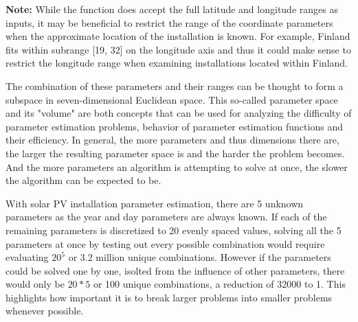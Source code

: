 \noindent \textbf{Note:} While the function does accept the full latitude and longitude ranges as inputs, it may be beneficial to restrict the range of the coordinate parameters when the approximate location of the installation is known. For example, Finland fits within subrange [19, 32] on the longitude axis and thus it could make sense to restrict the longitude range when examining installations located within Finland.

\vspace{3mm}
\noindent The combination of these parameters and their ranges can be thought to form a subspace in seven-dimensional Euclidean space. This so-called parameter space and its "volume" are both concepts that can be used for analyzing the difficulty of parameter estimation problems, behavior of parameter estimation functions and their efficiency. In general, the more parameters and thus dimensions there are, the larger the resulting parameter space is and the harder the problem becomes. And the more parameters an algorithm is attempting to solve at once, the slower the algorithm can be expected to be.

With solar PV installation parameter estimation, there are 5 unknown parameters as the year and day parameters are always known. If each of the remaining parameters is discretized to 20 evenly spaced values, solving all the 5 parameters at once by testing out every possible combination would require evaluating $20^5$ or 3.2 million unique combinations. However if the parameters could be solved one by one, isolted from the influence of other parameters, there would only be $20*5$ or 100 unique combinations, a reduction of 32000 to 1. This highlights how important it is to break larger problems into smaller problems whenever possible.



